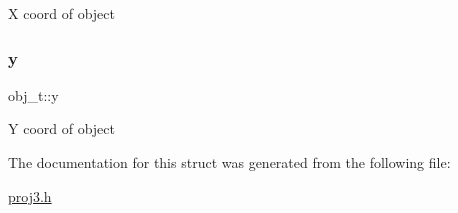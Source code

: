 X coord of object \mbox{\label{structobj__t_aab2451e07e3c283863a675e6f4354cf5}} 
\subsubsection{\texorpdfstring{y}{y}}
{\footnotesize\ttfamily obj\+\_\+t\+::y}

Y coord of object 

The documentation for this struct was generated from the following file\+:\begin{DoxyCompactItemize}
\item 
\mbox{\hyperlink{proj3_8h}{proj3.\+h}}\end{DoxyCompactItemize}
